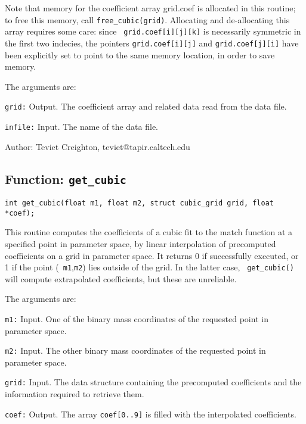 Note that memory for the coefficient array grid.coef is allocated in
this routine; to free this memory, call {\tt free\_cubic(grid)}.
Allocating and de-allocating this array requires some care: since {\tt
grid.coef[i][j][k]} is necessarily symmetric in the first two
indecies, the pointers {\tt grid.coef[i][j]} and {\tt grid.coef[j][i]}
have been explicitly set to point to the same memory location, in
order to save memory.

The arguments are:

\begin{description}
\item{\tt grid:}
  Output.  The coefficient array and related data read from the data
  file.

\item{\tt infile:}
  Input.  The name of the data file.

\end{description}

\begin{description}
\item{Author:}
  Teviet Creighton, teviet@tapir.caltech.edu
\end{description}


\clearpage
\subsection{Function: {\tt get\_cubic}}
\label{ss:get_cubic}

\begin{verbatim}
int get_cubic(float m1, float m2, struct cubic_grid grid, float *coef);
\end{verbatim}
This routine computes the coefficients of a cubic fit to the match
function at a specified point in parameter space, by linear
interpolation of precomputed coefficients on a grid in parameter
space.  It returns 0 if successfully executed, or 1 if the point ({\tt
m1},{\tt m2}) lies outside of the grid.  In the latter case, {\tt
get\_cubic()} will compute extrapolated coefficients, but these are
unreliable.

The arguments are:

\begin{description}
\item{\tt m1:}
  Input.  One of the binary mass coordinates of the requested point in
  parameter space.

\item{\tt m2:}
  Input.  The other binary mass coordinates of the requested point in
  parameter space.

\item{\tt grid:}
  Input.  The data structure containing the precomputed coefficients
  and the information required to retrieve them.

\item{\tt coef:}
  Output.  The array {\tt coef[0..9]} is filled with the interpolated
  coefficients.

\end{description}

